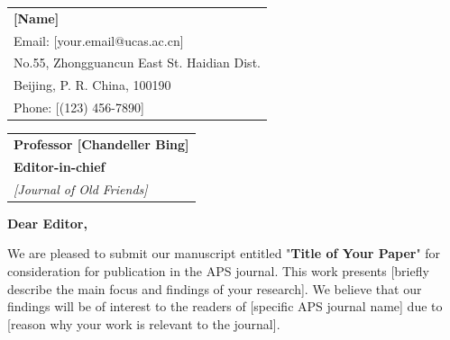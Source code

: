 \documentclass[a4paper,12pt]{article}
\newcommand{\MyColor}{MyBlue} %
\begin{document}
\bigskip %
\vspace*{1cm} %

\hfill
\begin{tabular}{l @{}}
\hfill \textbf{\textcolor{\MyColor}{[Name]}} \\ %
\hfill \textcolor{MyGray}{Email: [your.email@ucas.ac.cn]} \\ %
\hfill \textcolor{MyGray}{No.55, Zhongguancun East St. Haidian Dist.} \\ %
\hfill \textcolor{MyGray}{Beijing, P. R. China, 100190} \\ %
\hfill \textcolor{MyGray}{Phone: [(123) 456-7890]} \\ %
\end{tabular}


\bigskip %

\vspace*{1cm} %

\begin{tabular}{@{} l}
	\textbf{\textcolor{\MyColor}{Professor [Chandeller Bing]}} \\ %
	\textbf{\textcolor{\MyColor}{Editor-in-chief}} \\ %
	\textit{\textcolor{\MyColor}{[Journal of Old Friends]}} %
\end{tabular}

\bigskip %

\begin{flushleft}
    \textbf{\textcolor{\MyColor}{Dear Editor,}} %
\end{flushleft}

\vspace{0.5cm}

\noindent
We are pleased to submit our manuscript entitled "\textbf{Title of Your Paper}" for consideration for publication in the APS journal. This work presents [briefly describe the main focus and findings of your research]. We believe that our findings will be of interest to the readers of [specific APS journal name] due to [reason why your work is relevant to the journal].
\end{document}
